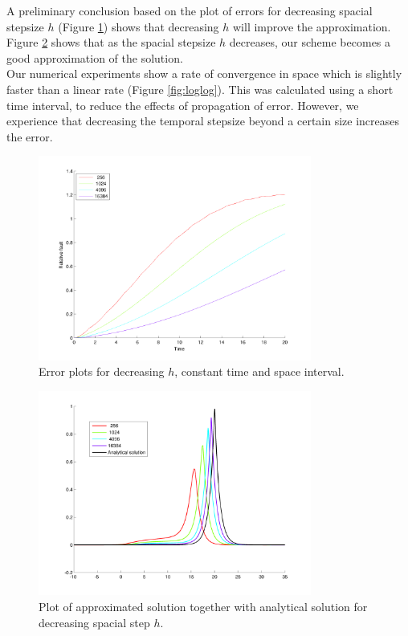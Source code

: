 A preliminary conclusion based on the plot of errors for decreasing spacial stepsize $h$ (Figure \ref{fig:erroroftime}) shows that decreasing $h$ will improve the approximation. Figure \ref{fig:attimeT} shows that as the spacial stepsize $h$ decreases, our scheme becomes a good approximation of the solution. \\


Our numerical experiments show a rate of convergence in space which is slightly faster than a linear rate (Figure \ref{fig:loglog}). This was calculated using a short time interval, to reduce the effects of propagation of error. However, we experience that decreasing the temporal stepsize beyond a certain size increases the error. 

\begin{figure}[h]
        \centering
        \includegraphics[width=0.8\textwidth]{gfx/erroroftime}
        \caption{Error plots for decreasing $h$, constant time and space interval.}
        \label{fig:erroroftime}
\end{figure}

\begin{figure}[h]
        \centering
        \includegraphics[width=0.8\textwidth]{gfx/attimeT}
        \caption{Plot of approximated solution together with analytical solution for decreasing spacial step $h$.}
        \label{fig:attimeT}
\end{figure}

